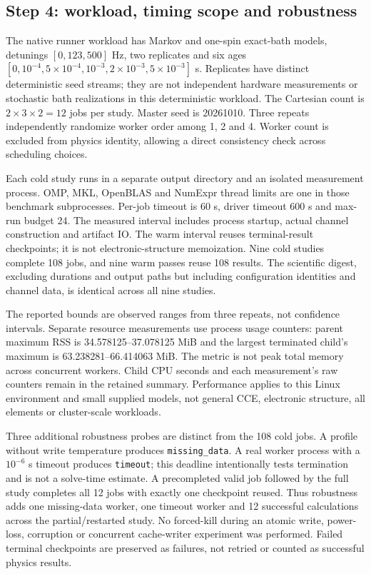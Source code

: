 \documentclass[10pt,a4paper]{article}
\newcommand{\code}[1]{\texttt{#1}}
\begin{document}
\subsection{Step 4: workload, timing scope and robustness}
The native runner workload has Markov and one-spin exact-bath models, detunings $[0,123,500]$ Hz, two replicates and six ages $[0,10^{-4},5\times10^{-4},10^{-3},2\times10^{-3},5\times10^{-3}]$ s. Replicates have distinct deterministic seed streams; they are not independent hardware measurements or stochastic bath realizations in this deterministic workload. The Cartesian count is $2\times3\times2=12$ jobs per study. Master seed is 20261010. Three repeats independently randomize worker order among 1, 2 and 4. Worker count is excluded from physics identity, allowing a direct consistency check across scheduling choices.

Each cold study runs in a separate output directory and an isolated measurement process. OMP, MKL, OpenBLAS and NumExpr thread limits are one in those benchmark subprocesses. Per-job timeout is 60 s, driver timeout 600 s and max-run budget 24. The measured interval includes process startup, actual channel construction and artifact IO. The warm interval reuses terminal-result checkpoints; it is not electronic-structure memoization. Nine cold studies complete 108 jobs, and nine warm passes reuse 108 results. The scientific digest, excluding durations and output paths but including configuration identities and channel data, is identical across all nine studies.


The reported bounds are observed ranges from three repeats, not confidence intervals. Separate resource measurements use process usage counters: parent maximum RSS is 34.578125--37.078125 MiB and the largest terminated child's maximum is 63.238281--66.414063 MiB. The metric is not peak total memory across concurrent workers. Child CPU seconds and each measurement's raw counters remain in the retained summary. Performance applies to this Linux environment and small supplied models, not general CCE, electronic structure, all elements or cluster-scale workloads.

Three additional robustness probes are distinct from the 108 cold jobs. A profile without write temperature produces \code{missing\_data}. A real worker process with a $10^{-6}$ s timeout produces \code{timeout}; this deadline intentionally tests termination and is not a solve-time estimate. A precompleted valid job followed by the full study completes all 12 jobs with exactly one checkpoint reused. Thus robustness adds one missing-data worker, one timeout worker and 12 successful calculations across the partial/restarted study. No forced-kill during an atomic write, power-loss, corruption or concurrent cache-writer experiment was performed. Failed terminal checkpoints are preserved as failures, not retried or counted as successful physics results.
\end{document}
